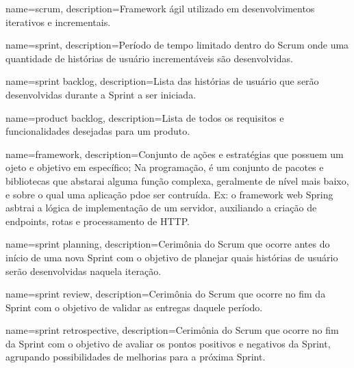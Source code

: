  {
    name=scrum,
    description={Framework ágil utilizado em desenvolvimentos iterativos
    e incrementais.}
}

 {
    name=sprint,
    description={Período de tempo limitado dentro do Scrum onde uma quantidade de histórias de usuário incrementáveis são desenvolvidas.}
}

 {
    name={sprint backlog},
    description={Lista das histórias de usuário que serão desenvolvidas durante a Sprint a ser iniciada.}
}

 {
    name={product backlog},
    description={Lista de todos os requisitos e funcionalidades desejadas para um produto.}
}
     
 {
    name=framework,
    description={Conjunto de ações e estratégias que possuem um ojeto e objetivo em específico;
    Na programação, é um conjunto de pacotes e bibliotecas que abstarai
    alguma função complexa, geralmente de nível mais baixo, e sobre o
    qual uma aplicação pdoe ser contruída. Ex: o framework web Spring
    asbtrai a lógica de implementação de um servidor, auxiliando a
    criação de endpoints, rotas e processamento de HTTP.}
}     
      
 {
    name={sprint planning},
    description={Cerimônia do Scrum que ocorre antes do início
    de uma nova Sprint com o objetivo de planejar quais histórias
    de usuário serão desenvolvidas naquela iteração.}
}  

 {
    name={sprint review},
    description={Cerimônia do Scrum que ocorre no fim da Sprint
    com o objetivo de validar as entregas daquele período.}
}      

 {
    name={sprint retrospective},
    description={Cerimônia do Scrum que ocorre no fim da Sprint com
    o objetivo de avaliar os pontos positivos e negativos
    da Sprint, agrupando possibilidades de melhorias
    para a próxima Sprint.}
}                    
